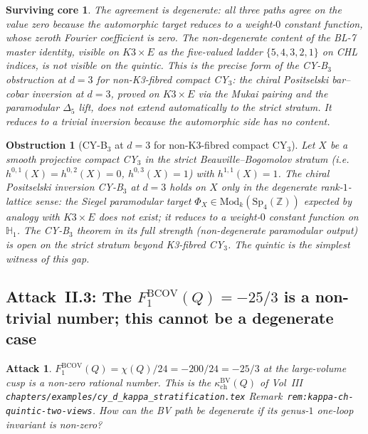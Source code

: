 \documentclass[11pt]{amsart}
\newtheorem{attack}[theorem]{Attack}
\newtheorem{surviving}[theorem]{Surviving core}
\newtheorem{obstruction}[theorem]{Obstruction}
\providecommand{\Z}{\mathbb{Z}}
\providecommand{\Sp}{\mathrm{Sp}}
\providecommand{\BV}{\mathrm{BV}}
\providecommand{\kch}{\kappa_{\mathrm{ch}}}
\begin{document}
\begin{surviving}
\label{surv:agreement-is-degenerate}
The agreement is \emph{degenerate}: all three paths agree on the
value zero because the automorphic target reduces to a weight-$0$
constant function, whose zeroth Fourier coefficient is zero. The
\emph{non-degenerate content} of the BL-7 master identity, visible on
$K3 \times E$ as the five-valued ladder $\{5, 4, 3, 2, 1\}$ on
CHL indices, is \emph{not visible} on the quintic. This is the
precise form of the CY-B$_3$ obstruction at $d = 3$ for
non-K3-fibred compact CY$_3$: the chiral Positselski bar--cobar
inversion at $d = 3$, proved on $K3 \times E$ via the Mukai
pairing and the paramodular $\Delta_5$ lift, \emph{does not extend
automatically} to the strict stratum. It reduces to a trivial
inversion because the automorphic side has no content.
\end{surviving}

\begin{obstruction}[CY-B$_3$ at $d = 3$ for non-K3-fibred compact CY$_3$]
\label{obs:cy-b3-quintic}
Let $X$ be a smooth projective compact CY$_3$ in the strict
Beauville--Bogomolov stratum (i.e.\ $h^{0,1}(X) = h^{0,2}(X) = 0$,
$h^{0,3}(X) = 1$) with $h^{1,1}(X) = 1$. The chiral Positselski
inversion CY-B$_3$ at $d = 3$ holds on $X$ only in the degenerate
rank-$1$-lattice sense: the Siegel paramodular target
$\Phi_X \in \mathrm{Mod}_k(\Sp_4(\Z))$ expected by analogy with
$K3 \times E$ \emph{does not exist}; it reduces to a
weight-$0$ constant function on $\mathbb{H}_1$.
The CY-B$_3$ theorem in its full strength (non-degenerate
paramodular output) is \emph{open} on the strict stratum beyond
K3-fibred CY$_3$. The quintic is the simplest witness of this gap.
\end{obstruction}

\subsection{Attack~II.3: The $F_1^{\mathrm{BCOV}}(Q) = -25/3$ is a
non-trivial number; this cannot be a degenerate case}

\begin{attack}
\label{att:f1-nontrivial}
$F_1^{\mathrm{BCOV}}(Q) = \chi(Q)/24 = -200/24 = -25/3$ at the
large-volume cusp is a non-zero rational number. This is the
$\kch^{\BV}(Q)$ of Vol~III
\texttt{chapters/examples/cy\_d\_kappa\_stratification.tex}
Remark~\texttt{rem:kappa-ch-quintic-two-views}. How can the
BV path be degenerate if its genus-$1$ one-loop invariant is
non-zero?
\end{attack}
\end{document}
